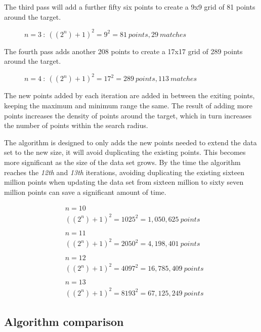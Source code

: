 \documentclass{article}
\begin{document}
The third pass will add a further fifty six points to create a 9x9 grid of 81 points around the target. 
\begin{figure}[h]

\caption{$n=3 \ :\ ((2^n)+1)^2 = 9^2 = 81 \ points, 29 \ matches$}
\label{fig:data-count-03}
\end{figure}

The fourth pass adds another 208 points to create a 17x17 grid of 289 points around the target. 
\begin{figure}[h]

\caption{$n=4 \ :\ ((2^n)+1)^2 = 17^2 = 289 \ points, 113 \ matches$}
\label{fig:data-count-04}
\end{figure}

The new points added by each iteration are added in between the exiting points, keeping the maximum and minimum range the same. The result of adding more points increases the density of points around the target, which in turn increases the number of points within the search radius.

The algorithm is designed to only adds the new points needed to extend the data set to the new size, it will avoid duplicating the existing points.
This becomes more significant as the size of the data set grows. By the time the algorithm reaches the \textit{12th} and \textit{13th} iterations, avoiding duplicating the existing sixteen million points when updating the data set from sixteen million to sixty seven million points can save a significant amount of time.

\begin{equation*}
\begin{split}
& n = 10\\
& ((2^n)+1)^2 = 1025^2 = 1,050,625 \ points
\\
\\
& n = 11\\
& ((2^n)+1)^2 = 2050^2 = 4,198,401 \ points
\\
\\
& n = 12\\
& ((2^n)+1)^2 = 4097^2 = 16,785,409 \ points
\\
\\
& n = 13\\
& ((2^n)+1)^2 = 8193^2 = 67,125,249 \ points
\end{split}
\end{equation*}

\subsection{Algorithm comparison}
\label{database-algorithms}
\end{document}

